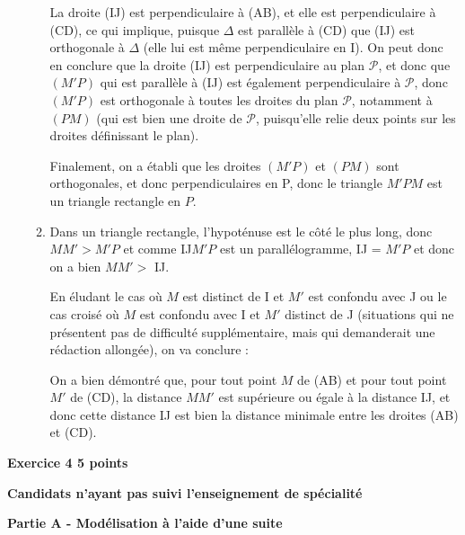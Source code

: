 \documentclass[10pt]{article}
\begin{document}
\begin{enumerate}
\begin{enumerate}
La droite (IJ) est perpendiculaire à (AB), et elle est perpendiculaire à (CD), ce qui implique, puisque $\Delta$ est parallèle à (CD) que (IJ) est orthogonale à $\Delta$ (elle lui est même perpendiculaire en I). On peut donc en conclure que la droite (IJ) est perpendiculaire au plan $ \mathcal{P} $, et donc que $(M'P)$ qui est parallèle à (IJ) est également perpendiculaire à $\mathcal{P}$, donc $(M'P)$ est orthogonale à toutes les droites du plan $\mathcal{P}$, notamment à $ (PM) $ (qui est bien une droite de $ \mathcal{P} $, puisqu'elle relie deux points sur les droites définissant le plan).
		
Finalement, on a établi que les droites $(M'P)$ et $(PM)$ sont orthogonales, et donc perpendiculaires en P, donc le triangle $M'PM$ est un triangle rectangle en $P$.
		
		\item Dans un triangle rectangle, l'hypoténuse est le côté le plus long, donc $MM' > M'P$ et comme IJ$M'P$ est un parallélogramme, IJ = $M'P$ et donc on a bien $MM' >$ IJ.
		
En éludant le cas où $M$ est distinct de I et $M'$ est confondu avec J ou le cas croisé où $M$ est confondu avec I et $M'$ distinct de J (situations qui ne présentent pas de difficulté supplémentaire, mais qui demanderait une rédaction allongée), on va conclure :
		
On a bien démontré que, pour tout point $M$ de (AB) et pour tout point $M'$ de (CD), la distance $MM'$ est supérieure ou égale à la distance IJ, et donc cette distance IJ est bien la distance minimale entre les droites (AB) et (CD).
	\end{enumerate}	
\end{enumerate}

\vspace{0,5cm}
	
\textbf{Exercice 4 \hfill  5 points}
	
\textbf{Candidats n'ayant pas suivi l'enseignement de spécialité}
	
\medskip
	
\textbf{Partie A - Modélisation à l'aide d'une suite}
	
\medskip
	
\end{document}
